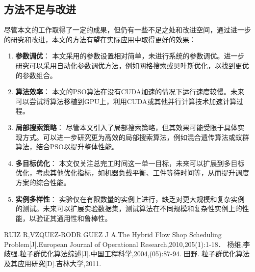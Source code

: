 \documentclass[12pt]{article}
\begin{document}
	\subsection{方法不足与改进}
	
	尽管本文的工作取得了一定的成果，但仍有一些不足之处和改进空间，通过进一步的研究和改进，本文的方法有望在实际应用中取得更好的效果：
	
	\begin{enumerate}
		\item \textbf{参数调优}：
		本文采用的参数设置相对简单，未进行系统的参数调优。进一步研究可以采用自动化参数调优方法，例如网格搜索或贝叶斯优化，以找到更优的参数组合。
		
		\item \textbf{算法效率}：
		本文的PSO算法在没有CUDA加速的情况下运行速度较慢。未来可以尝试将算法移植到GPU上，利用CUDA或其他并行计算技术加速计算过程。
		
		\item \textbf{局部搜索策略}：
		尽管本文引入了局部搜索策略，但其效果可能受限于具体实现方式。可以进一步研究更为高效的局部搜索算法，例如混合遗传算法或蚁群算法，结合PSO以提升整体性能。
		
		\item \textbf{多目标优化}：
		本文仅关注总完工时间这一单一目标，未来可以扩展到多目标优化，考虑其他优化指标，如机器负载平衡、工件等待时间等，从而提升调度方案的综合性能。
		
		\item \textbf{实例多样性}：
		实验仅在有限数量的实例上进行，缺乏对更大规模和复杂实例的测试。未来可以扩展实验数据集，测试算法在不同规模和复杂性实例上的性能，以验证其通用性和鲁棒性。
	\end{enumerate}
	
	\begin{thebibliography}{99}  
		 RUIZ R,VZQUEZ-RODRGUEZ J A.The Hybrid Flow Shop Scheduling Problem[J].European Journal of Operational Research,2010,205(1):1-18．
		 杨维,李歧强.粒子群优化算法综述[J].中国工程科学,2004,(05):87-94.
		 田野. 粒子群优化算法及其应用研究[D].吉林大学,2011.
				
	\end{thebibliography}
	
	
\end{document}
